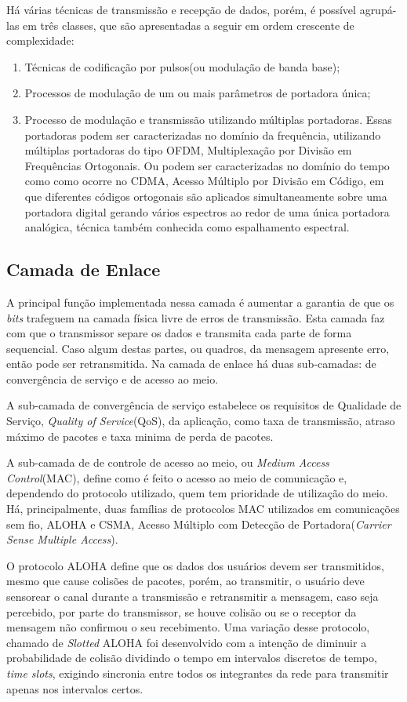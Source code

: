 Há várias técnicas de transmissão e recepção de dados, porém, é possível agrupá-las em três classes, que são apresentadas a seguir em ordem crescente de complexidade:
\begin{enumerate}
      \item Técnicas de codificação por pulsos(ou modulação de banda base);
      \item Processos de modulação de um ou mais parâmetros de portadora única;
      \item Processo de modulação e transmissão utilizando múltiplas portadoras. Essas portadoras podem ser caracterizadas no domínio da frequência, utilizando múltiplas portadoras do tipo OFDM, Multiplexação por Divisão em Frequências Ortogonais. Ou podem ser caracterizadas no domínio do tempo como como ocorre no CDMA, Acesso Múltiplo por Divisão em Código, em que diferentes códigos ortogonais são aplicados simultaneamente sobre uma portadora digital gerando vários espectros ao redor de uma única portadora analógica, técnica também conhecida como espalhamento espectral.
\end{enumerate}

\subsection{Camada de Enlace}
A principal função implementada nessa camada é aumentar a garantia de que os \emph{bits} trafeguem na camada física livre de erros de transmissão. Esta camada faz com que o transmissor separe os dados e transmita cada parte de forma sequencial. Caso algum destas partes, ou quadros, da mensagem apresente erro, então pode ser retransmitida. Na camada de enlace há duas sub-camadas: de convergência de serviço e de acesso ao meio.

A sub-camada de convergência de serviço estabelece os requisitos de Qualidade de Serviço, \emph{Quality of Service}(QoS), da aplicação, como taxa de transmissão, atraso máximo de pacotes e taxa minima de perda de pacotes.

A sub-camada de de controle de acesso ao meio, ou \emph{Medium Access Control}(MAC), define como é feito o acesso ao meio de comunicação e, dependendo do protocolo utilizado, quem tem prioridade de utilização do meio. Há, principalmente, duas famílias de protocolos MAC utilizados em comunicações sem fio, ALOHA e CSMA, Acesso Múltiplo com Detecção de Portadora(\emph{Carrier Sense Multiple Access}).

O protocolo ALOHA define que os dados dos usuários devem ser transmitidos, mesmo que cause colisões de pacotes, porém, ao transmitir, o usuário deve sensorear o canal durante a transmissão e retransmitir a mensagem, caso seja percebido, por parte do transmissor, se houve colisão ou se o receptor da mensagem não confirmou o seu recebimento. Uma variação desse protocolo, chamado de \emph{Slotted} ALOHA foi desenvolvido com a intenção de diminuir a probabilidade de colisão dividindo o tempo em intervalos discretos de tempo, \emph{time slots}, exigindo sincronia entre todos os integrantes da rede para transmitir apenas nos intervalos certos.

